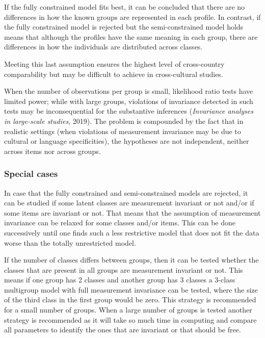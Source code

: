 \documentclass[12pt,a4paper,oneside]{reedthesis}
\begin{document}
If the fully constrained model fits best, it can be concluded that there are no differences in how the known groups are represented in each profile. In contrast, if the fully constrained model is rejected but the semi-constrained model holds means that although the profiles have the same meaning in each group, there are differences in how the individuals are distributed across classes.

Meeting this last assumption ensures the highest level of cross-country comparability but may be difficult to achieve in cross-cultural studies.

When the number of observations per group is small, likelihood ratio tests have limited power; while with large groups, violations of invariance detected in such tests may be inconsequential for the substantive inferences (\emph{Invariance analyses in large-scale studies}, 2019). The problem is compounded by the fact that in realistic settings (when violations of measurement invariance may be due to cultural or language specificities), the hypotheses are not independent, neither across items nor across groups.

\hypertarget{special-cases}{%
\subsubsection{Special cases}\label{special-cases}}

In case that the fully constrained and semi-constrained models are rejected, it can be studied if some latent classes are measurement invariant or not and/or if some items are invariant or not. That means that the assumption of measurement invariance can be relaxed for some classes and/or items. This can be done successively until one finds such a less restrictive model that does not fit the data worse than the totally unrestricted model.

If the number of classes differs between groups, then it can be tested whether the classes that are present in all groups are measurement invariant or not. This means if one group has 2 classes and another group has 3 classes a 3-class multigroup model with full measurement invariance can be tested, where the size of the third class in the first group would be zero. This strategy is recommended for a small number of groups. When a large number of groups is tested another strategy is recommended as it will take so much time in computing and compare all parameters to identify the ones that are invariant or that should be free.
\end{document}
